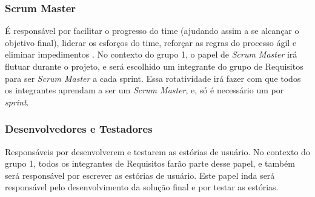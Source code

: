 \subsubsection{Scrum Master}
É responsável por facilitar o progresso do time (ajudando assim a se alcançar o objetivo final), liderar os esforços do time, reforçar as regras do processo ágil e eliminar impedimentos \cite[p. 47-48]{safe001}. No contexto do grupo 1, o papel de \emph{Scrum Master} irá flutuar durante o projeto, e será escolhido um integrante do grupo de Requisitos para ser \emph{Scrum Master} a cada sprint. Essa rotatividade irá fazer com que todos os integrantes aprendam a ser um \emph{Scrum Master}, e, só é necessário um por \emph{sprint}.

\subsubsection{Desenvolvedores e Testadores}
Responsáveis por desenvolverem e testarem as estórias de usuário. No contexto do grupo 1, todos os integrantes de Requisitos farão parte desse papel, e também será responsável por escrever as estórias de usuário. Este papel inda será responsável pelo desenvolvimento da solução final e por testar as estórias.